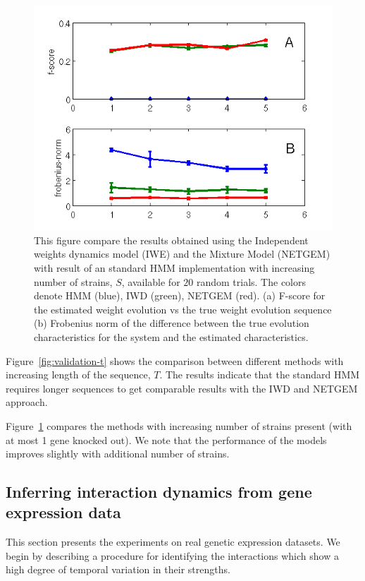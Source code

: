 \documentclass{bioinfo}
\begin{document}
\begin{figure}[h]
  \centering
  \includegraphics[scale=0.55]{results/mm_strain}
  \caption{This figure compare the results obtained using the Independent weights dynamics model (IWE)
    and the Mixture Model (NETGEM) with result of an standard HMM  implementation with
    increasing number of strains, $S$, available for $20$ random trials. The colors denote  HMM (blue), IWD (green),
    NETGEM (red). (a) F-score for the estimated weight evolution vs the true
    weight evolution sequence (b)
    Frobenius norm of the difference between the true evolution
    characteristics for the system and the estimated characteristics. } 
  \label{fig:validation-s}
\end{figure}


Figure~\ref{fig:validation-t} shows the comparison between different
methods with increasing length of the sequence, $T$. The results indicate that the
standard HMM requires longer sequences to get comparable results with
the IWD and NETGEM approach. 

Figure~\ref{fig:validation-s} compares the
methods with increasing number of strains present (with at most 1 gene
knocked out). We note that the performance of the models improves
slightly with additional number of strains. 

\subsection{Inferring interaction dynamics from gene expression data}
\label{sec:real-world-datasets}
This section  presents the experiments on real genetic expression
datasets. We begin by describing a procedure for identifying the interactions
which show a high degree of temporal variation in their strengths.  
\end{document}
